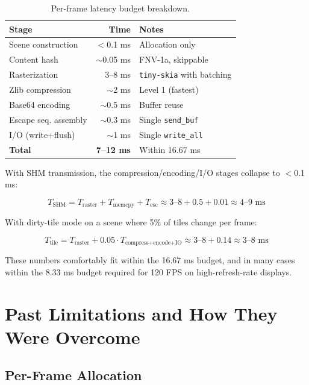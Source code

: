 \documentclass[11pt, a4paper, twocolumn]{article}
\begin{document}
\begin{table}[H]
\centering
\caption{Per-frame latency budget breakdown.}
\label{tab:budget}
\small
\begin{tabular}{@{}lrl@{}}
\toprule
\textbf{Stage} & \textbf{Time} & \textbf{Notes} \\
\midrule
Scene construction  & $<$0.1 ms & Allocation only \\
Content hash        & $\sim$0.05 ms & FNV-1a, skippable \\
Rasterization       & 3--8 ms & \texttt{tiny-skia} with batching \\
Zlib compression    & $\sim$2 ms & Level 1 (fastest) \\
Base64 encoding     & $\sim$0.5 ms & Buffer reuse \\
Escape seq. assembly & $\sim$0.3 ms & Single \texttt{send\_buf} \\
I/O (write+flush)   & $\sim$1 ms & Single \texttt{write\_all} \\
\midrule
\textbf{Total}      & \textbf{7--12 ms} & Within 16.67 ms \\
\bottomrule
\end{tabular}
\end{table}

With SHM transmission, the compression/encoding/I/O stages collapse to $<$0.1 ms:

\[
T_{\text{SHM}} = T_{\text{raster}} + T_{\text{memcpy}} + T_{\text{esc}} \approx 3\text{--}8 + 0.5 + 0.01 \approx 4\text{--}9 \text{ ms}
\]

With dirty-tile mode on a scene where 5\% of tiles change per frame:

\[
T_{\text{tile}} = T_{\text{raster}} + 0.05 \cdot T_{\text{compress+encode+IO}} \approx 3\text{--}8 + 0.14 \approx 3\text{--}8 \text{ ms}
\]

These numbers comfortably fit within the 16.67 ms budget, and in many cases within the 8.33 ms budget required for 120 FPS on high-refresh-rate displays.

\section{Past Limitations and How They Were Overcome}
\label{sec:limitations}

\subsection{Per-Frame Allocation}
\end{document}
